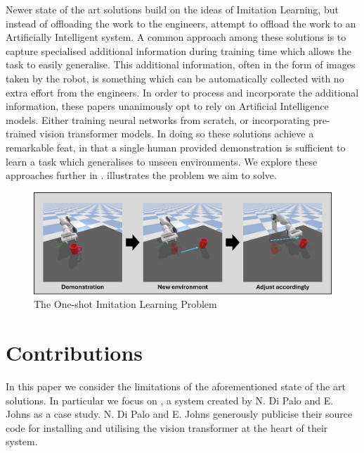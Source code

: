 Newer state of the art solutions \cite{coarse-to-fine, one-shot-pose-estimate, one-shot-imitation} build on the ideas of Imitation Learning, but instead of offloading the work to the engineers, attempt to offload the work to an Artificially Intelligent system. A common approach among these solutions is to capture specialised additional information during training time which allows the task to easily generalise. This additional information, often in the form of images taken by the robot, is something which can be automatically collected with no extra effort from the engineers. In order to process and incorporate the additional information, these papers unanimously opt to rely on Artificial Intelligence models. Either training neural networks from scratch, or incorporating pre-trained vision transformer models. In doing so these solutions achieve a remarkable feat, in that a single human provided demonstration is sufficient to learn a task which generalises to unseen environments. We explore these  approaches further in .  illustrates the problem we aim to solve.\\

\begin{figure}[h]
    \centering
    \includegraphics[width=\textwidth]{figures/intro.png}
    \caption{The One-shot Imitation Learning Problem}
    \label{fig:intro}
\end{figure}

\section{Contributions}
In this paper we consider the limitations of the aforementioned state of the art solutions. In particular we focus on , a system created by N. Di Palo and E. Johns \cite{one-shot-imitation} as a case study. N. Di Palo and E. Johns generously publicise their source code for installing and utilising the vision transformer at the heart of their system.\\

